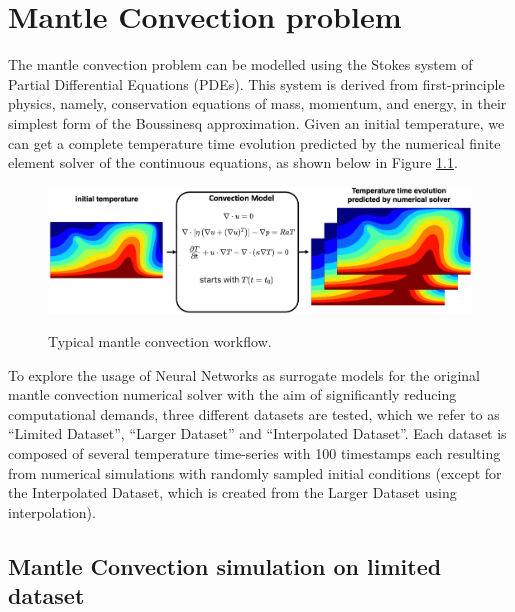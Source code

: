 \chapter{Mantle Convection problem}\label{chap:evaluation}

The mantle convection problem can be modelled using the Stokes system of Partial Differential Equations (PDEs).
This system is derived from first-principle physics, namely, conservation equations of mass, momentum, and energy, in their simplest form of the Boussinesq approximation. Given an initial temperature, we can get a complete temperature time evolution predicted by the numerical finite element solver of the continuous equations, as shown below in Figure \ref{figure:MC_workflow}.

\begin{figure}[H]
    \caption{Typical mantle convection workflow.}
    \includegraphics[scale=0.15]{figures/mantle_convection_images/Mantle_Convection_workflow.png}
    \label{figure:MC_workflow}
\end{figure}

To explore the usage of Neural Networks as surrogate models for the original mantle convection numerical solver with the aim of significantly reducing computational demands, three different datasets are tested, which we refer to as  ``Limited Dataset'', ``Larger Dataset'' and ``Interpolated Dataset''. Each dataset is composed of several temperature time-series with 100 timestamps each resulting from numerical simulations with randomly sampled initial conditions (except for the Interpolated Dataset, which is created from the Larger Dataset using interpolation).

\section{Mantle Convection simulation on limited dataset}

